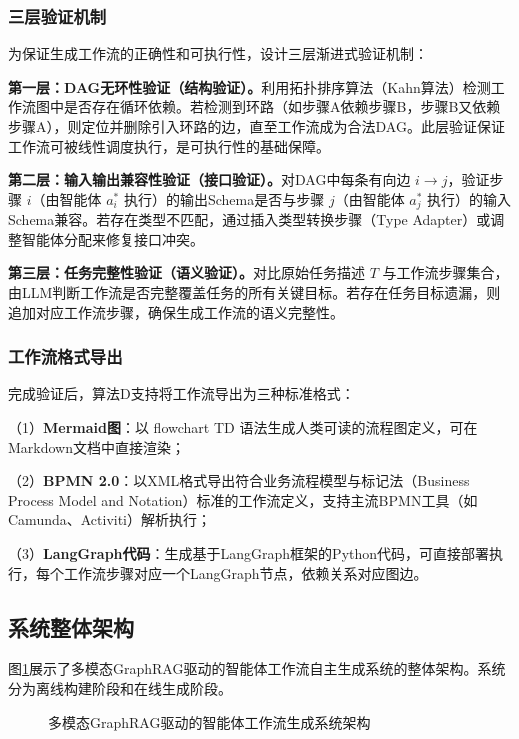 \subsubsection{三层验证机制}

为保证生成工作流的正确性和可执行性，设计三层渐进式验证机制：

\textbf{第一层：DAG无环性验证（结构验证）。}利用拓扑排序算法（Kahn算法）检测工作流图中是否存在循环依赖。若检测到环路（如步骤A依赖步骤B，步骤B又依赖步骤A），则定位并删除引入环路的边，直至工作流成为合法DAG。此层验证保证工作流可被线性调度执行，是可执行性的基础保障。

\textbf{第二层：输入输出兼容性验证（接口验证）。}对DAG中每条有向边 $i \rightarrow j$，验证步骤 $i$（由智能体 $a_i^*$ 执行）的输出Schema是否与步骤 $j$（由智能体 $a_j^*$ 执行）的输入Schema兼容。若存在类型不匹配，通过插入类型转换步骤（Type Adapter）或调整智能体分配来修复接口冲突。

\textbf{第三层：任务完整性验证（语义验证）。}对比原始任务描述 $T$ 与工作流步骤集合，由LLM判断工作流是否完整覆盖任务的所有关键目标。若存在任务目标遗漏，则追加对应工作流步骤，确保生成工作流的语义完整性。

\subsubsection{工作流格式导出}

完成验证后，算法D支持将工作流导出为三种标准格式：

（1）\textbf{Mermaid图}：以 flowchart TD 语法生成人类可读的流程图定义，可在Markdown文档中直接渲染；

（2）\textbf{BPMN 2.0}：以XML格式导出符合业务流程模型与标记法（Business Process Model and Notation）标准的工作流定义，支持主流BPMN工具（如Camunda、Activiti）解析执行；

（3）\textbf{LangGraph代码}：生成基于LangGraph框架的Python代码，可直接部署执行，每个工作流步骤对应一个LangGraph节点，依赖关系对应图边。

\subsection{系统整体架构}

图\ref{fig:system_architecture}展示了多模态GraphRAG驱动的智能体工作流自主生成系统的整体架构。系统分为离线构建阶段和在线生成阶段。

\begin{figure}[htbp]
\centering

\caption{多模态GraphRAG驱动的智能体工作流生成系统架构}
\label{fig:system_architecture}
\end{figure}

